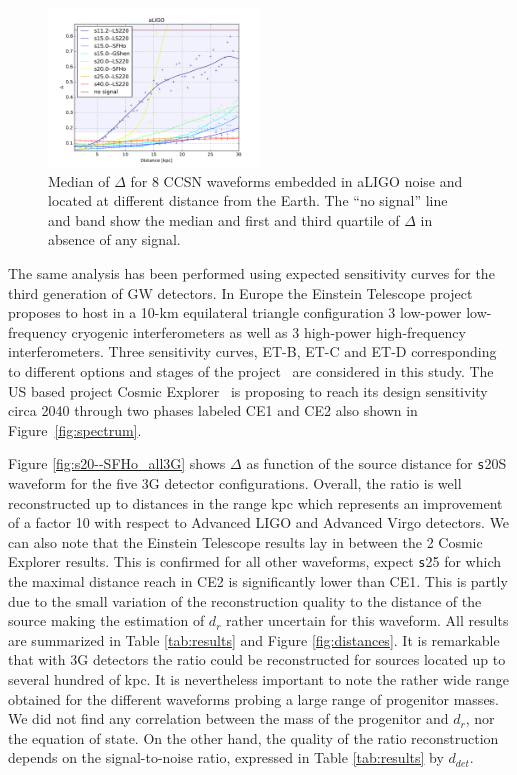\begin{figure}
  \centering
  \includegraphics[width=0.5\textwidth]{plots/aLIGO_delta_allwvfs}
 \caption{Median of $\Delta$ for 8 CCSN waveforms embedded in aLIGO noise and located at different distance from the Earth. The ``no signal'' line and band show the median and first and third quartile of $\Delta$ in absence of any signal.} \label{fig:aLIGO_prec_allwvf}
\end{figure}

The same analysis has been performed using expected sensitivity curves for the third generation of
GW detectors. In Europe the Einstein Telescope project proposes to host in a 10-km
equilateral triangle configuration 3 low-power low-frequency cryogenic interferometers as well as 3
high-power high-frequency interferometers. Three sensitivity curves, ET-B, ET-C and ET-D corresponding
to different options and stages of the project~\cite{Hild_2011} are considered in this study.
The US based project Cosmic Explorer~\cite{reitze2019cosmic} is proposing to reach its design
sensitivity circa 2040 through two phases labeled CE1 and CE2 also shown in Figure~\ref{fig:spectrum}. 

Figure \ref{fig:s20--SFHo_all3G} shows $\Delta$ as function of the source distance for {\texttt s20S}
waveform for the five 3G detector configurations. Overall, the ratio is well reconstructed up to distances
in the range \unit[100--200]{kpc} which represents an improvement of a factor 10 with respect to
Advanced LIGO and Advanced Virgo detectors. We can also note that the Einstein Telescope results lay in
between the 2 Cosmic Explorer results. This is confirmed for all other waveforms, expect {\texttt s25}
for which the maximal distance reach in CE2 is significantly lower than CE1. This is partly due to the
small variation of the reconstruction quality to the distance of the source making the estimation of $d_r$
rather uncertain for this waveform. All results are summarized in Table \ref{tab:results} and Figure
\ref{fig:distances}. It is remarkable that with 3G detectors the ratio could be reconstructed for sources
located up to several hundred of kpc. It is nevertheless important to note the rather wide range obtained
for the different waveforms probing a large range of progenitor masses.
We did not find any correlation between the mass of the progenitor and $d_r$, nor the equation of state.
On the other hand, the quality
of the ratio reconstruction depends on the signal-to-noise ratio, expressed in Table \ref{tab:results} by
$d_{det}$.

